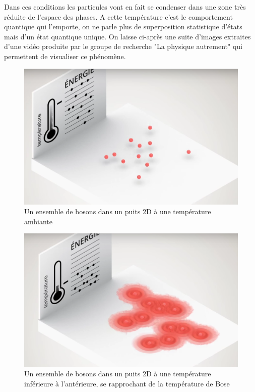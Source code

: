 Dans ces conditions les particules vont en fait se condenser dans une zone très réduite de l'espace des phases. A cette température c'est le comportement quantique qui l'emporte, on ne parle plus de superposition statistique d'états mais d'un état quantique unique. On laisse ci-après une suite d'images extraites d'une vidéo produite par le groupe de recherche "La physique autrement" qui permettent de visualiser ce phénomène.


\begin{figure}[H]
	\begin{center}
		\includegraphics[scale=0.2]{./img/IM2}
		\caption{Un ensemble de bosons dans un puits 2D à une température ambiante}
	\end{center}
\end{figure}

\begin{figure}[H]
	\begin{center}
		\includegraphics[scale=0.2]{./img/IM3}
		\caption{Un ensemble de bosons dans un puits 2D à une température inférieure à l'antérieure, se rapprochant de la température de Bose}
	\end{center}
\end{figure}

